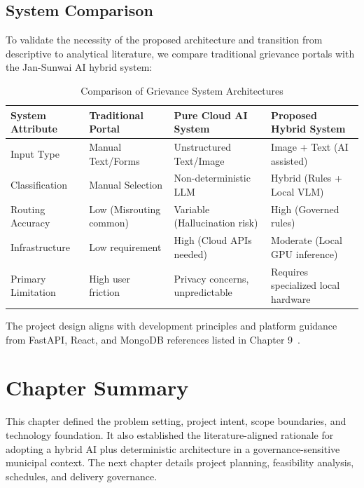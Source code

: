 \subsection{System Comparison}

To validate the necessity of the proposed architecture and transition from descriptive to analytical literature, we compare traditional grievance portals with the Jan-Sunwai AI hybrid system:

\begin{table}[H]
\centering
\caption{Comparison of Grievance System Architectures}
\begin{tabularx}{\textwidth}{|>{\RaggedRight\arraybackslash}X|>{\RaggedRight\arraybackslash}X|>{\RaggedRight\arraybackslash}X|>{\RaggedRight\arraybackslash}X|}
\hline
\textbf{System Attribute} & \textbf{Traditional Portal} & \textbf{Pure Cloud AI System} & \textbf{Proposed Hybrid System} \\ \hline
Input Type & Manual Text/Forms & Unstructured Text/Image & Image + Text (AI assisted) \\ \hline
Classification & Manual Selection & Non-deterministic LLM & Hybrid (Rules + Local VLM) \\ \hline
Routing Accuracy & Low (Misrouting common) & Variable (Hallucination risk) & High (Governed rules) \\ \hline
Infrastructure & Low requirement & High (Cloud APIs needed) & Moderate (Local GPU inference) \\ \hline
Primary Limitation & High user friction & Privacy concerns, unpredictable & Requires specialized local hardware \\ \hline
\end{tabularx}
\end{table}

The project design aligns with development principles and platform guidance from FastAPI, React, and MongoDB references listed in Chapter 9~\cite{fastapi_docs, react_docs, mongodb_docs}.

\section{Chapter Summary}

This chapter defined the problem setting, project intent, scope boundaries, and technology foundation. It also established the literature-aligned rationale for adopting a hybrid AI plus deterministic architecture in a governance-sensitive municipal context. The next chapter details project planning, feasibility analysis, schedules, and delivery governance.

